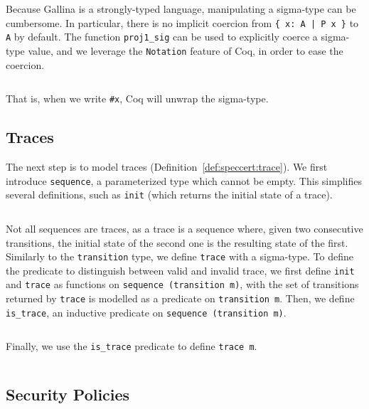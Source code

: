 \inputminted[gobble=2,firstline=29,lastline=32]{coq}{Listings/SpecCert.v}

Because {\textsc Gallina} is a strongly-typed language, manipulating a sigma-type
can be cumbersome.
%
In particular, there is no implicit coercion from \texttt{\{ x: A | P x \}} to
\texttt{A} by default.
%
The function \texttt{proj1\_sig} can be used to explicitly coerce a sigma-type
value, and we leverage the \texttt{Notation} feature of Coq, in order to ease
the coercion.

\inputminted[gobble=2,firstline=34,lastline=35]{coq}{Listings/SpecCert.v}

That is, when we write \texttt{\#x}, Coq will unwrap the sigma-type.

\subsection{Traces}

The next step is to model traces (Definition~\ref{def:speccert:trace}).
%
We first introduce \texttt{sequence}, a parameterized type which cannot be
empty.
%
This simplifies several definitions, such as \texttt{init} (which returns the
initial state of a trace).

\inputminted[gobble=2,firstline=39,lastline=46]{coq}{Listings/SpecCert.v}

Not all sequences are traces, as a trace is a sequence where, given two
consecutive transitions, the initial state of the second one is the resulting
state of the first.
%
Similarly to the \texttt{transition} type, we define \texttt{trace} with a
sigma-type.
%
To define the predicate to distinguish between valid and invalid trace, we first
define \texttt{init} and \texttt{trace} as functions on \texttt{sequence
  (transition~m)}, with the set of transitions returned by \texttt{trace} is
modelled as a predicate on \texttt{transition m}.
%
Then, we define \texttt{is\_trace}, an inductive predicate on \texttt{sequence
  (transition~m)}.

\inputminted[gobble=2,firstline=62,lastline=71]{coq}{Listings/SpecCert.v}

Finally, we use the \texttt{is\_trace} predicate to define \texttt{trace m}.

\inputminted[gobble=2,firstline=73,lastline=76]{coq}{Listings/SpecCert.v}

\subsection{Security Policies}

